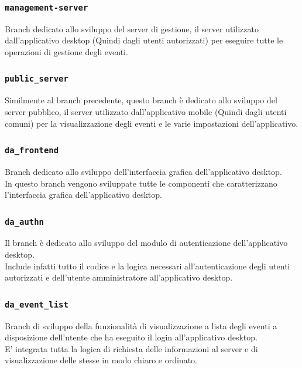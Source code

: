 \documentclass{article}
\begin{document}
\subsubsection{\texttt{management-server}}

Branch dedicato allo sviluppo del server di gestione, il server utilizzato dall'applicativo desktop (Quindi dagli utenti autorizzati) per eseguire tutte le operazioni di gestione degli eventi.

\subsubsection{\texttt{public\_server}}

Similmente al branch precedente, questo branch è dedicato allo sviluppo del server pubblico, il server utilizzato dall'applicativo mobile (Quindi dagli utenti comuni) per la visualizzazione degli eventi e le varie impostazioni dell'applicativo.

\subsubsection{\texttt{da\_frontend}}

Branch dedicato allo sviluppo dell'interfaccia grafica dell'applicativo desktop.\\
In questo branch vengono sviluppate tutte le componenti che caratterizzano l'interfaccia grafica dell'applicativo desktop.

\subsubsection{\texttt{da\_authn}}

Il branch è dedicato allo sviluppo del modulo di autenticazione dell'applicativo desktop.\\
Include infatti tutto il codice e la logica necessari all'autenticazione degli utenti autorizzati e dell'utente amministratore all'applicativo desktop.

\subsubsection{\texttt{da\_event\_list}}

Branch di sviluppo della funzionalità di visualizzazione a lista degli eventi a disposizione dell'utente che ha eseguito il login all'applicativo desktop.\\
E' integrata tutta la logica di richiesta delle informazioni al server e di visualizzazione delle stesse in modo chiaro e ordinato.
\end{document}

